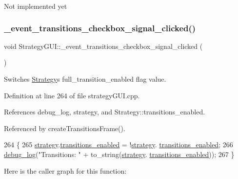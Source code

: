 Not implemented yet \mbox{\label{class_strategy_g_u_i_a9ca1e9548a5cf277de63fe92ad92002b}} 
\subsubsection{\texorpdfstring{\+\_\+event\+\_\+transitions\+\_\+checkbox\+\_\+signal\+\_\+clicked()}{\_event\_transitions\_checkbox\_signal\_clicked()}}
{\footnotesize\ttfamily void Strategy\+G\+U\+I\+::\+\_\+event\+\_\+transitions\+\_\+checkbox\+\_\+signal\+\_\+clicked (\begin{DoxyParamCaption}{ }\end{DoxyParamCaption})\hspace{0.3cm}{\ttfamily [private]}}



Switches \hyperlink{class_strategy}{Strategy}\textquotesingle{}s full\+\_\+transition\+\_\+enabled flag value. 



Definition at line 264 of file strategy\+G\+U\+I.\+cpp.



References debug\+\_\+log, strategy, and Strategy\+::transitions\+\_\+enabled.



Referenced by create\+Transitions\+Frame().


\begin{DoxyCode}
264                                                              \{
265     \hyperlink{class_strategy_g_u_i_af8e7b112adca9d3de45cbb0ab00a80bb}{strategy}.\hyperlink{class_strategy_a6d59806a95ef79a25d30c4f139c94671}{transitions\_enabled} = !\hyperlink{class_strategy_g_u_i_af8e7b112adca9d3de45cbb0ab00a80bb}{strategy}.
      \hyperlink{class_strategy_a6d59806a95ef79a25d30c4f139c94671}{transitions\_enabled};
266     \hyperlink{debug_8hpp_afde3f42696113719c9ae35507125ee6e}{debug\_log}(\textcolor{stringliteral}{"Transitions: "} + to\_string(\hyperlink{class_strategy_g_u_i_af8e7b112adca9d3de45cbb0ab00a80bb}{strategy}.
      \hyperlink{class_strategy_a6d59806a95ef79a25d30c4f139c94671}{transitions\_enabled}));
267 \}
\end{DoxyCode}
Here is the caller graph for this function\+:
\mbox{\label{class_strategy_g_u_i_aaeb2b9affadab5eafc8885f983a1cc36}} 
